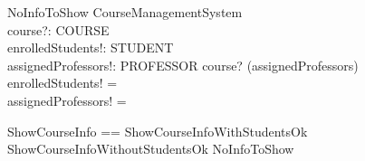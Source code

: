 \begin{schema}{NoInfoToShow}
    \Xi CourseManagementSystem \\
    course?: COURSE \\
    enrolledStudents!: \power STUDENT \\
    assignedProfessors!: \power PROFESSOR
    \where
    course? \notin \dom(assignedProfessors) \\
    enrolledStudents! = \emptyset \\
    assignedProfessors! = \emptyset
\end{schema}

\begin{zed}
    ShowCourseInfo == ShowCourseInfoWithStudentsOk \lor ShowCourseInfoWithoutStudentsOk \lor NoInfoToShow
\end{zed}
